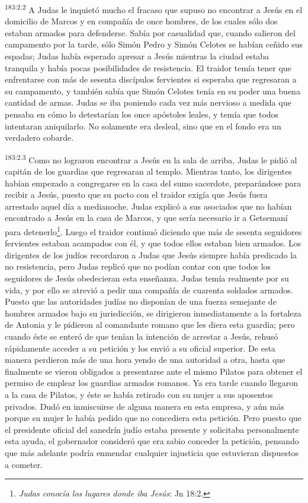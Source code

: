 \par 
\textsuperscript{183:2.2} A Judas le inquietó mucho el fracaso que supuso no encontrar a Jesús en el domicilio de Marcos y en compañía de once hombres, de los cuales sólo dos estaban armados para defenderse. Sabía por casualidad que, cuando salieron del campamento por la tarde, sólo Simón Pedro y Simón Celotes se habían ceñido sus espadas; Judas había esperado apresar a Jesús mientras la ciudad estaba tranquila y había pocas posibilidades de resistencia. El traidor temía tener que enfrentarse con más de sesenta discípulos fervientes si esperaba que regresaran a su campamento, y también sabía que Simón Celotes tenía en su poder una buena cantidad de armas. Judas se iba poniendo cada vez más nervioso a medida que pensaba en cómo lo detestarían los once apóstoles leales, y temía que todos intentaran aniquilarlo. No solamente era desleal, sino que en el fondo era un verdadero cobarde.

\par 
\textsuperscript{183:2.3} Como no lograron encontrar a Jesús en la sala de arriba, Judas le pidió al capitán de los guardias que regresaran al templo. Mientras tanto, los dirigentes habían empezado a congregarse en la casa del sumo sacerdote, preparándose para recibir a Jesús, puesto que su pacto con el traidor exigía que Jesús fuera arrestado aquel día a medianoche. Judas explicó a sus asociados que no habían encontrado a Jesús en la casa de Marcos, y que sería necesario ir a Getsemaní para detenerlo\footnote{\textit{Judas conocía los lugares donde iba Jesús}: Jn 18:2.}. Luego el traidor continuó diciendo que más de sesenta seguidores fervientes estaban acampados con él, y que todos ellos estaban bien armados. Los dirigentes de los judíos recordaron a Judas que Jesús siempre había predicado la no resistencia, pero Judas replicó que no podían contar con que todos los seguidores de Jesús obedecieran esta enseñanza. Judas temía realmente por su vida, y por ello se atrevió a pedir una compañía de cuarenta soldados armados. Puesto que las autoridades judías no disponían de una fuerza semejante de hombres armados bajo su jurisdicción, se dirigieron inmediatamente a la fortaleza de Antonia y le pidieron al comandante romano que les diera esta guardia; pero cuando éste se enteró de que tenían la intención de arrestar a Jesús, rehusó rápidamente acceder a su petición y los envió a su oficial superior. De esta manera perdieron más de una hora yendo de una autoridad a otra, hasta que finalmente se vieron obligados a presentarse ante el mismo Pilatos para obtener el permiso de emplear los guardias armados romanos. Ya era tarde cuando llegaron a la casa de Pilatos, y éste se había retirado con su mujer a sus aposentos privados. Dudó en inmiscuirse de alguna manera en esta empresa, y aún más porque su mujer le había pedido que no concediera esta petición. Pero puesto que el presidente oficial del sanedrín judío estaba presente y solicitaba personalmente esta ayuda, el gobernador consideró que era sabio conceder la petición, pensando que más adelante podría enmendar cualquier injusticia que estuvieran dispuestos a cometer.

